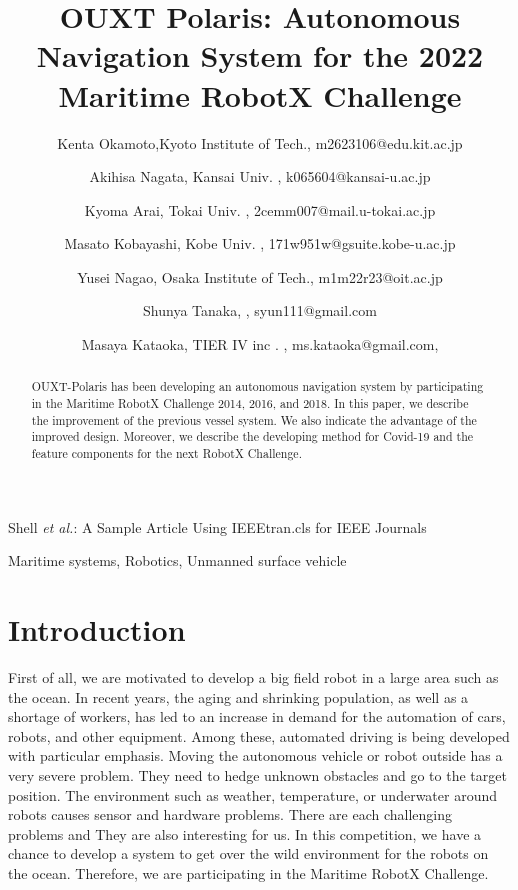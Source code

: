 \documentclass[lettersize,journal]{IEEEtran}
\begin{document}
\title{OUXT Polaris: Autonomous Navigation System for the 2022 Maritime RobotX Challenge}
\author{
    Kenta Okamoto,Kyoto Institute of Tech., m2623106@edu.kit.ac.jp \\ \and
    Akihisa Nagata, Kansai Univ. , k065604@kansai-u.ac.jp \\ \and
    Kyoma Arai, Tokai Univ. , 2cemm007@mail.u-tokai.ac.jp \\ \and
    Masato Kobayashi, Kobe Univ. , 171w951w@gsuite.kobe-u.ac.jp \\ \and
    Yusei Nagao, Osaka Institute of Tech., m1m22r23@oit.ac.jp \\ \and
    Shunya Tanaka, , syun111@gmail.com \\ \and
    Masaya Kataoka, TIER IV inc . , ms.kataoka@gmail.com,
}

%
{Shell \MakeLowercase{\textit{et al.}}: A Sample Article Using IEEEtran.cls for IEEE Journals}


\maketitle

\begin{abstract}
OUXT-Polaris has been developing an autonomous navigation system by participating in the 
Maritime RobotX Challenge 2014, 2016, and 2018. 
In this paper, we describe the improvement of the previous vessel system. 
We also indicate the advantage of the improved design.
Moreover, we describe the developing method for Covid-19 and the 
feature components for the next RobotX Challenge.
\end{abstract}

\begin{IEEEkeywords}
Maritime systems, Robotics, Unmanned surface vehicle
\end{IEEEkeywords}

\section{Introduction}
First of all, we are motivated to develop a big field robot in a large area such as the ocean.
In recent years, the aging and shrinking population, as well as a shortage of workers,
has led to an increase in demand for the automation of cars, robots, and other equipment.
Among these, automated driving is being developed with particular emphasis.
Moving the autonomous vehicle or robot outside has a very severe problem.
They need to hedge unknown obstacles and go to the target position.
The environment such as weather, temperature, or underwater around robots causes sensor and hardware problems.
There are each challenging problems and They are also interesting for us.  
In this competition, we have a chance to develop a system to get over the wild environment 
for the robots on the ocean. Therefore, we are participating in the Maritime RobotX Challenge.
\end{document}
